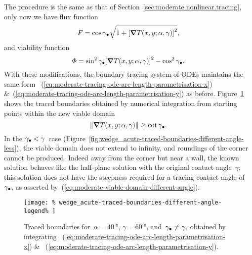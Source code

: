 The procedure is the same
as that of Section~\ref{sec:moderate.nonlinear.tracing},
only now we have flux function
\begin{equation}
  F =
    \cos\gamma_\tr
    \sqrt{1 + \squarebr[\bulkysize]{\del T (x, y; \alpha, \gamma)}^2},
  \label{eq:moderate-flux-function-different-angle}
\end{equation}
and viability function
\begin{equation}
  \Phi =
    \sin^2\gamma_\tr \squarebr[\bulkysize]{\del T (x, y; \alpha, \gamma)}^2
    - \cos^2\gamma_\tr.
    \label{eq:moderate-viability-function-different-angle}
\end{equation}
With these modifications,
the boundary tracing system of ODEs maintains the same form~%
  (\ref{eq:moderate-tracing-ode-arc-length-parametrisation-x})
\&~(\ref{eq:moderate-tracing-ode-arc-length-parametrisation-y})
as before.
Figure~\ref{fig:wedge_acute-traced-boundaries-different-angle}
shows the traced boundaries obtained by numerical integration
from starting points within the new viable domain
\begin{equation}
  \norm[\bulkysize]{\del T (x, y; \alpha, \gamma)} \ge \cot\gamma_\tr.
  \label{eq:moderate-viable-domain-different-angle}
\end{equation}
In the $\gamma_\bullet < \gamma$~case
(Figure~\ref{fig:wedge_acute-traced-boundaries-different-angle-less}),
the viable domain does not extend to infinity,
and roundings of the corner cannot be produced.
Indeed away from the corner but near a wall,
the known solution behaves like the half-plane solution
with the original contact angle~$\gamma$;
this solution does not have the steepness required
for a tracing contact angle of~$\gamma_\bullet$,
as asserted by~(\ref{eq:moderate-viable-domain-different-angle}).

\begin{figure}
  \newcommand*{\subfigurewidth}{0.4\textwidth}
  \centering
  \texttt{[image: \%
    wedge\_acute-traced-boundaries-different-angle-legend\%
  ]}
  \hspace*{\fill}
  \begin{subfigure}[t]{\subfigurewidth}
  \end{subfigure}
    \hfill
  \begin{subfigure}[t]{\subfigurewidth}
  \end{subfigure}
  \hspace*{\fill}
  \caption{
    Traced boundaries for~$\alpha = \SI{40}{\degree}$,
    $\gamma = \SI{60}{\degree}$, and~$\gamma_\bullet \ne \gamma$,
    obtained by integrating~%
      (\ref{eq:moderate-tracing-ode-arc-length-parametrisation-x})
    \&~%
      (\ref{eq:moderate-tracing-ode-arc-length-parametrisation-y}).
  }
  \label{fig:wedge_acute-traced-boundaries-different-angle}
\end{figure}

